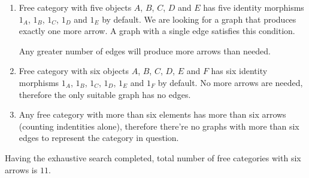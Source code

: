 \documentclass[12pt]{article}
\begin{document}
\begin{enumerate}
\begin{enumerate}
      \item Free category with five objects $A$, $B$, $C$, $D$ and $E$ has five identity morphisms $1_A$, $1_B$, $1_C$, $1_D$ and $1_E$ by default. We are looking for a graph that produces exactly one more arrow. A graph with a single edge satisfies this condition. 
            \begin{figure}[H]
              \centering
            \end{figure}
            Any greater number of edges will produce more arrows than needed.

      \item Free category with six objects $A$, $B$, $C$, $D$, $E$ and $F$ has six identity morphisms $1_A$, $1_B$, $1_C$, $1_D$, $1_E$ and $1_F$ by default. No more arrows are needed, therefore the only suitable graph has no edges.
            \begin{figure}[H]
              \centering
            \end{figure}

        \item Any free category with more than six elements has more than six arrows (counting indentities alone), therefore there're no graphs with more than six edges to represent the category in question.
      \end{enumerate}
      Having the exhaustive search completed, total number of free categories with six arrows is $11$.
\end{enumerate}
\end{document}

